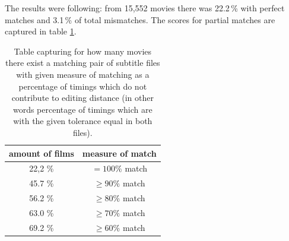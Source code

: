 

The results were following: from 15,552 movies there was 22.2\,\%
with perfect matches and 3.1\,\% of total mismatches. The scores for partial matches are captured in table \ref{opensubtitles:matchTable}.

\begin{table}[h]

\begin{center}
\begin{tabular}{|c|c|}
\hline
amount of films & measure of match\\ \hline
22,2 \% & $= 100 \%$ match \\
45.7 \% & $\ge 90 \%$ match \\ 
56.2 \% & $\ge 80 \%$ match \\ 
63.0 \% & $\ge 70 \%$ match \\
69.2 \% & $\ge 60 \%$ match \\ \hline
\end{tabular}
\end{center}

\caption{Table capturing for how many movies there exist a matching pair of subtitle files with given measure of matching as a percentage of timings which do not contribute to editing distance (in other words percentage of timings which are with the given tolerance equal in both files).}\label{opensubtitles:matchTable}
\end{table}

